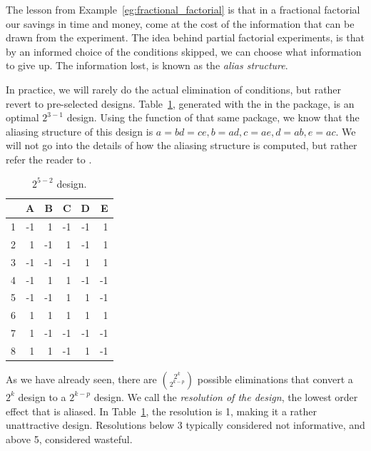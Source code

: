 The lesson from Example~\ref{eg:fractional_factorial} is that in a fractional factorial our savings in time and money, come at the cost of the information that can be drawn from the experiment.
The idea behind partial factorial experiments, is that by an informed choice of the conditions skipped, we can choose what information to give up. The information lost, is known as the \emph{alias structure}.

In practice, we will rarely do the actual elimination of conditions, but rather revert to pre-selected designs. 
Table~\ref{tab:partial_factorial_ii}, generated with the  in the  \R package, is an optimal $2^{3-1}$ design.
Using the  function of that same package, we know that the aliasing structure of this design is
$a=bd=ce, b=ad, c=ae, d=ab, e=ac$.
We will not go into the details of how the aliasing structure is computed, but rather refer the reader to \cite{cox_theory_2000}.
\begin{table}[ht]
\centering
\begin{tabular}{rrrrrr}
  \hline
 & A & B & C & D & E \\ 
  \hline
1 & -1 & 1 & -1 & -1 & 1 \\ 
  2 & 1 & -1 & 1 & -1 & 1 \\ 
  3 & -1 & -1 & -1 & 1 & 1 \\ 
  4 & -1 & 1 & 1 & -1 & -1 \\ 
  5 & -1 & -1 & 1 & 1 & -1 \\ 
  6 & 1 & 1 & 1 & 1 & 1 \\ 
  7 & 1 & -1 & -1 & -1 & -1 \\ 
  8 & 1 & 1 & -1 & 1 & -1 \\ 
   \hline
\end{tabular}
\label{tab:partial_factorial_ii}
\caption[Fractional Factorial Design]{$2^{5-2}$ design.}
\end{table}


\begin{definition}
As we have already seen, there are $\binom{2^k}{2^{k-p}}$ possible eliminations that convert a $2^k$ design to a $2^{k-p}$ design.
We call the \emph{resolution of the design}, the lowest order effect that is aliased. 
In Table~\ref{tab:partial_factorial_ii}, the resolution is 1, making it a rather unattractive design. 
Resolutions below 3 typically considered not informative, and above 5, considered wasteful.
\end{definition}


